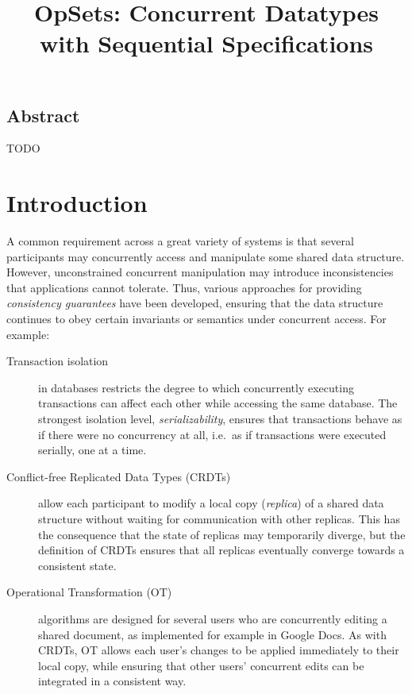 \documentclass[twocolumn,10pt]{article}
\begin{document}
\sloppy
\title{OpSets: Concurrent Datatypes with Sequential Specifications}
\author{}
\date{}
\maketitle

\subsection*{Abstract}
TODO

\section{Introduction}

A common requirement across a great variety of systems is that several participants may concurrently access and manipulate some shared data structure.
However, unconstrained concurrent manipulation may introduce inconsistencies that applications cannot tolerate.
Thus, various approaches for providing \emph{consistency guarantees} have been developed, ensuring that the data structure continues to obey certain invariants or semantics under concurrent access. For example:

\begin{description}
\item[Transaction isolation] in databases restricts the degree to which concurrently executing transactions can affect each other while accessing the same database.
The strongest isolation level, \emph{serializability}, ensures that transactions behave as if there were no concurrency at all, i.e.\ as if transactions were executed serially, one at a time.

\item[Conflict-free Replicated Data Types (CRDTs)] allow each participant to modify a local copy (\emph{replica}) of a shared data structure without waiting for communication with other replicas.
This has the consequence that the state of replicas may temporarily diverge, but the definition of CRDTs ensures that all replicas eventually converge towards a consistent state.

\item[Operational Transformation (OT)] algorithms are designed for several users who are concurrently editing a shared document, as implemented for example in Google Docs.
As with CRDTs, OT allows each user's changes to be applied immediately to their local copy, while ensuring that other users' concurrent edits can be integrated in a consistent way.
\end{description}
\end{document}
